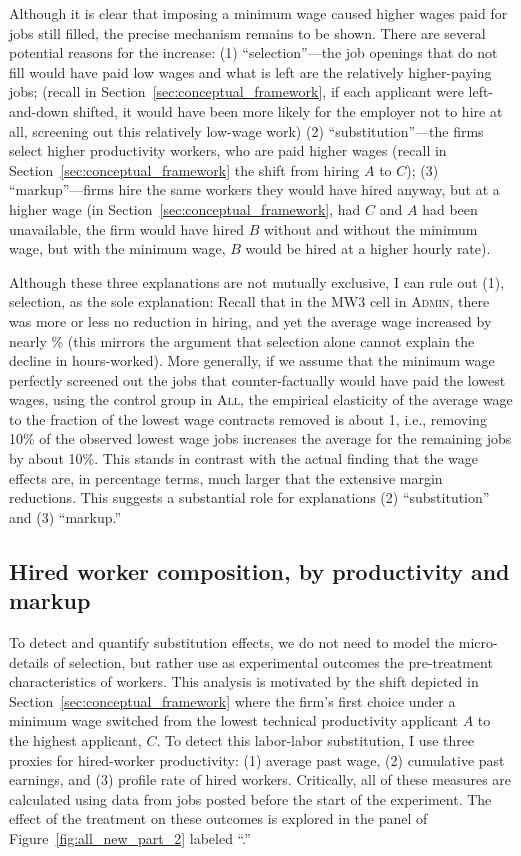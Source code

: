 \documentclass[AER]{AEA}
\newcommand{\all}{\textsc{All}}
\newcommand{\admin}{\textsc{Admin}}
\begin{document}
Although it is clear that imposing a minimum wage caused higher wages paid for jobs still filled, the precise mechanism remains to be shown.
There are several potential reasons for the increase: 
(1) ``selection''---the job openings that do not fill would have paid low wages and what is left are the relatively higher-paying jobs; (recall in Section~\ref{sec:conceptual_framework}, if each applicant were left-and-down shifted, it would have been more likely for the employer not to hire at all, screening out this relatively low-wage work)
(2) ``substitution''---the firms select higher productivity workers, who are paid higher wages (recall in Section~\ref{sec:conceptual_framework} the shift from hiring $A$ to $C$);
(3) ``markup''---firms hire the same workers they would have hired anyway, but at a higher wage (in Section~\ref{sec:conceptual_framework}, had $C$ and $A$ had been unavailable, the firm would have hired $B$ without and without the minimum wage, but with the minimum wage, $B$ would be hired at a higher hourly rate). 

Although these three explanations are not mutually exclusive, I can rule out (1), selection, as the sole explanation: 
Recall that in the MW3 cell in \admin{}, there was more or less no reduction in hiring, and yet the average wage increased by nearly \ADMINThreelogmeanwageovercontractpctchange{}\% (this mirrors the argument that selection alone cannot explain the decline in hours-worked).
More generally, if we assume that the minimum wage perfectly screened out the jobs that counter-factually would have paid the lowest wages, using the control group in \all{}, the empirical elasticity of the average wage to the fraction of the lowest wage contracts removed is about 1, i.e., removing 10\% of the observed lowest wage jobs increases the average for the remaining jobs by about 10\%.
This stands in contrast with the actual finding that the wage effects are, in percentage terms, much larger that the extensive margin reductions.
This suggests a substantial role for explanations (2) ``substitution'' and (3) ``markup.''

\subsection{Hired worker composition, by productivity and markup}

To detect and quantify substitution effects, we do not need to model the micro-details of selection, but rather use as experimental outcomes the pre-treatment characteristics of workers.
This analysis is motivated by the shift depicted in Section~\ref{sec:conceptual_framework} where the firm's first choice under a minimum wage switched from the lowest technical productivity applicant $A$ to the highest applicant, $C$.
To detect this labor-labor substitution, I use three proxies for hired-worker productivity: 
(1) average past wage,
(2) cumulative past earnings, and
(3) profile rate of hired workers.
Critically, all of these measures are calculated using data from jobs posted before the start of the experiment. 
The effect of the treatment on these outcomes is explored in the panel of Figure~\ref{fig:all_new_part_2} labeled ``\panelC{}.'' 
\end{document}
